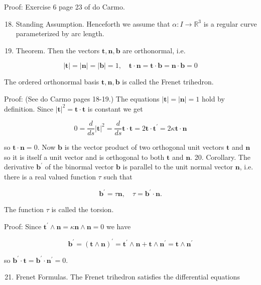 \documentclass[10pt]{article}
\begin{document}
Proof: Exercise 6 page 23 of do Carmo.

\begin{enumerate}
  \setcounter{enumi}{17}
  \item Standing Assumption. Henceforth we assume that $\alpha: I \rightarrow \mathbb{R}^{3}$ is a regular curve parameterized by arc length.

  \item Theorem. Then the vectors $\mathbf{t}, \mathbf{n}, \mathbf{b}$ are orthonormal, i.e.

\end{enumerate}

$$
|\mathbf{t}|=|\mathbf{n}|=|\mathbf{b}|=1, \quad \mathbf{t} \cdot \mathbf{n}=\mathbf{t} \cdot \mathbf{b}=\mathbf{n} \cdot \mathbf{b}=0
$$

The ordered orthonormal basis $\mathbf{t}, \mathbf{n}, \mathbf{b}$ is called the Frenet trihedron.

Proof: (See do Carmo pages 18-19.) The equations $|\mathbf{t}|=|\mathbf{n}|=1$ hold by definition. Since $|\mathbf{t}|^{2}=\mathbf{t} \cdot \mathbf{t}$ is constant we get

$$
0=\frac{d}{d s}|\mathbf{t}|^{2}=\frac{d}{d s} \mathbf{t} \cdot \mathbf{t}=2 \mathbf{t} \cdot \mathbf{t}^{\prime}=2 \kappa \mathbf{t} \cdot \mathbf{n}
$$

so $\mathbf{t} \cdot \mathbf{n}=0$. Now $\mathbf{b}$ is the vector product of two orthogonal unit vectors $\mathbf{t}$ and $\mathbf{n}$ so it is itself a unit vector and is orthogonal to both $\mathbf{t}$ and $\mathbf{n}$. 20. Corollary. The derivative $\mathbf{b}^{\prime}$ of the binormal vector $\mathbf{b}$ is parallel to the unit normal vector $\mathbf{n}$, i.e. there is a real valued function $\tau$ such that

$$
\mathbf{b}^{\prime}=\tau \mathbf{n}, \quad \tau=\mathbf{b}^{\prime} \cdot \mathbf{n} .
$$

The function $\tau$ is called the torsion.

Proof: Since $\mathbf{t}^{\prime} \wedge \mathbf{n}=\kappa \mathbf{n} \wedge \mathbf{n}=0$ we have

$$
\mathbf{b}^{\prime}=(\mathbf{t} \wedge \mathbf{n})^{\prime}=\mathbf{t}^{\prime} \wedge \mathbf{n}+\mathbf{t} \wedge \mathbf{n}^{\prime}=\mathbf{t} \wedge \mathbf{n}^{\prime}
$$

so $\mathbf{b}^{\prime} \cdot \mathbf{t}=\mathbf{b}^{\prime} \cdot \mathbf{n}^{\prime}=0$.

\begin{enumerate}
  \setcounter{enumi}{20}
  \item Frenet Formulas. The Frenet trihedron satisfies the differential equations
\end{enumerate}
\end{document}
